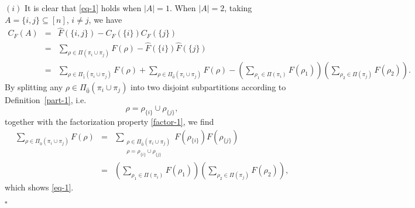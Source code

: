 \documentclass[12pt]{article}
\newenvironment{Proof}{\removelastskip\par\medskip
\noindent{\em Proof.} \rm}{\penalty-20\null\hfill$\square$\par\medbreak}
\numberwithin{equation}{section}
\begin{document}
\begin{Proof}
 \noindent
 $(i)$ 
 It is clear that \eqref{eq-1} holds when $|A|=1$. 
 When $|A|=2$, taking $A=\{i,j\} \subseteq[n]$,
 $i\not= j$, we have 
\begin{eqnarray*}
C_F(A)&=&\widehat{F}(\{i,j\})-C_F(\{i\})C_F(\{j\})\\
&=&\sum_{\rho\in\Pi(\pi_i \cup\pi_j )}F(\rho)-\widehat{F}(\{i\})\widehat{F}(\{j\})\\
&=&\sum_{\rho\in\Pi_{\widehat{1}}(\pi_i \cup\pi_j )}F(\rho)+\sum_{\rho\in\Pi_{\widehat{0}}(\pi_i \cup\pi_j )}F(\rho)-\left(
\sum_{\rho_1\in\Pi(\pi_i)}F(\rho_1)\right)
\left(
\sum_{\rho_2\in\Pi(\pi_j)}F(\rho_2)\right).
\end{eqnarray*}
By splitting any $\rho\in\Pi_{\widehat{0}}(\pi_i\cup\pi_j)$
into two disjoint subpartitions according to Definition~\ref{part-1}, i.e. 
$$\rho=\rho_{\{i\}}\cup\rho_{\{j\}}, 
$$
together with the factorization property \eqref{factor-1}, we find 
\begin{eqnarray}
  \nonumber
  \sum_{\rho\in\Pi_{\widehat{0}}(\pi_i \cup\pi_j)}F(\rho)&=&\sum_{\substack{\rho\in\Pi_{\widehat{0}}(\pi_i\cup\pi_j)
      \\
\nonumber
\rho=\rho_{\{i\}}\cup\rho_{\{j\}}}}F(\rho_{\{i\}})F(\rho_{\{j\}})
  \\
\nonumber
  &=&\left(
\sum_{\rho_1\in\Pi(\pi_i)}F(\rho_1)\right)
\left(
\sum_{\rho_2\in\Pi(\pi_j)}F(\rho_2)\right), 
\end{eqnarray}
 which shows \eqref{eq-1}. 

 \smallskip


\end{Proof}
\end{document}
